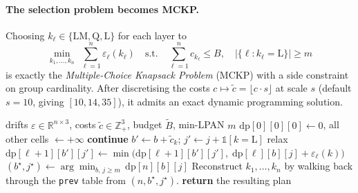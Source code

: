 \documentclass[11pt,a4paper]{article}
\begin{document}
\paragraph{The selection problem becomes MCKP.}
Choosing $k_\ell\in\{\mathrm{LM},\mathrm{Q},\mathrm{L}\}$ for each layer
to
\[
\min_{k_1,\dots,k_n} \;\sum_{\ell=1}^{n} \varepsilon_\ell(k_\ell)
\quad\text{s.t.}\quad \sum_{\ell=1}^{n} c_{k_\ell} \le B,
\quad |\{\ell : k_\ell = \mathrm{L}\}| \ge m
\]
is exactly the \emph{Multiple-Choice Knapsack Problem} (MCKP) with a
side constraint on group cardinality. After discretising the costs
$c \mapsto \tilde c = \lfloor c \cdot s \rfloor$ at scale $s$
(default $s=10$, giving $[10,14,35]$), it admits an exact dynamic
programming solution.

\begin{algorithm}[H]
\caption{\textsc{SelectCompositionMCKP}}
\label{alg:mckp}
\begin{algorithmic}[1]
\Require drifts $\varepsilon \in \mathbb R^{n\times 3}$, costs
         $\tilde c \in \mathbb Z^3_+$, budget $\tilde B$, min-LPAN $m$
\State $\mathrm{dp}[0][0][0] \gets 0$, all other cells $\gets +\infty$
     \textbf{continue} \EndIf
        \State $b' \gets b + \tilde c_k$;\;
               $j' \gets j + \mathbb 1[k=\mathrm{L}]$
            \State relax
                $\mathrm{dp}[\ell{+}1][b'][j']
                 \gets \min\!\bigl(\mathrm{dp}[\ell{+}1][b'][j'],\;
                                   \mathrm{dp}[\ell][b][j] + \varepsilon_\ell(k)\bigr)$
        \EndIf
    \EndFor
\EndFor
\State $(b^\star, j^\star) \gets \arg\min_{b,\,j\ge m}\, \mathrm{dp}[n][b][j]$
\State Reconstruct $k_1,\dots,k_n$ by walking back through the
       \texttt{prev} table from $(n, b^\star, j^\star)$.
\State \textbf{return} the resulting plan
\end{algorithmic}
\end{algorithm}
\end{document}
